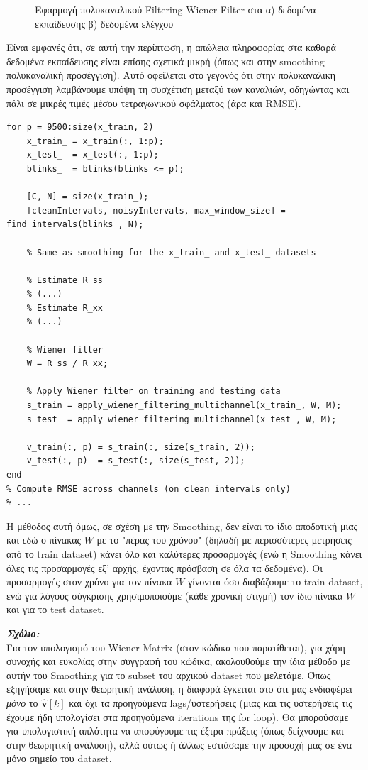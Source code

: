 \documentclass[12pt]{article} %
\begin{document}
\begin{figure}[ht!]
    \caption{Εφαρμογή πολυκαναλικού Filtering Wiener Filter 
    στα α) δεδομένα εκπαίδευσης β) δεδομένα ελέγχου}
    \label{fig:multi_channel_filtering}
\end{figure}

Είναι εμφανές ότι, σε αυτή την περίπτωση, 
η απώλεια πληροφορίας στα καθαρά δεδομένα εκπαίδευσης είναι επίσης σχετικά μικρή (όπως και στην smoothing πολυκαναλική προσέγγιση).  
Αυτό οφείλεται στο γεγονός ότι στην πολυκαναλική προσέγγιση λαμβάνουμε υπόψη τη συσχέτιση μεταξύ των καναλιών,  
οδηγώντας και πάλι σε μικρές τιμές μέσου τετραγωνικού σφάλματος (άρα και RMSE).

\begin{lstlisting}[caption=Computation of Autocorrelation Matrices for Wiener Filter]
for p = 9500:size(x_train, 2)
    x_train_ = x_train(:, 1:p);
    x_test_  = x_test(:, 1:p);
    blinks_  = blinks(blinks <= p);

    [C, N] = size(x_train_);
    [cleanIntervals, noisyIntervals, max_window_size] = find_intervals(blinks_, N);

    % Same as smoothing for the x_train_ and x_test_ datasets

    % Estimate R_ss 
    % (...)
    % Estimate R_xx 
    % (...)

    % Wiener filter
    W = R_ss / R_xx;

    % Apply Wiener filter on training and testing data
    s_train = apply_wiener_filtering_multichannel(x_train_, W, M);
    s_test  = apply_wiener_filtering_multichannel(x_test_, W, M);

    v_train(:, p) = s_train(:, size(s_train, 2));
    v_test(:, p)  = s_test(:, size(s_test, 2));
end
% Compute RMSE across channels (on clean intervals only)
% ...
\end{lstlisting}

Η μέθοδος αυτή όμως, σε σχέση με την Smoothing, δεν είναι το ίδιο αποδοτική μιας και εδώ ο πίνακας $W$ με το "πέρας του χρόνου" (δηλαδή με περισσότερες μετρήσεις από το train dataset) κάνει όλο και καλύτερες προσαρμογές (ενώ η Smoothing κάνει όλες τις προσαρμογές εξ' αρχής, έχοντας πρόσβαση σε όλα τα δεδομένα). Οι προσαρμογές στον χρόνο για τον πίνακα $W$ γίνονται όσο διαβάζουμε το train dataset, ενώ για λόγους σύγκρισης χρησιμοποιούμε (κάθε χρονική στιγμή) τον ίδιο πίνακα $W$ και για το test dataset. 

\vspace{+5pt}

\textit{\textbf{Σχόλιο:}} \\
Για τον υπολογισμό του Wiener Matrix (στον κώδικα που παρατίθεται), για χάρη συνοχής και ευκολίας στην συγγραφή του κώδικα, ακολουθούμε την ίδια μέθοδο με αυτήν του Smoothing για το subset του αρχικού dataset που μελετάμε. Όπως εξηγήσαμε και στην θεωρητική ανάλυση, η διαφορά έγκειται στο ότι μας ενδιαφέρει \textit{μόνο} το $\hat{\mathbf{v}}[k]$ και όχι τα προηγούμενα lags/υστερήσεις (μιας και τις υστερήσεις τις έχουμε ήδη υπολογίσει στα προηγούμενα iterations της for loop). Θα μπορούσαμε για υπολογιστική απλότητα να αποφύγουμε τις έξτρα πράξεις (όπως δείχνουμε και στην θεωρητική ανάλυση), αλλά ούτως ή άλλως εστιάσαμε την προσοχή μας σε ένα μόνο σημείο του dataset.
\end{document}

